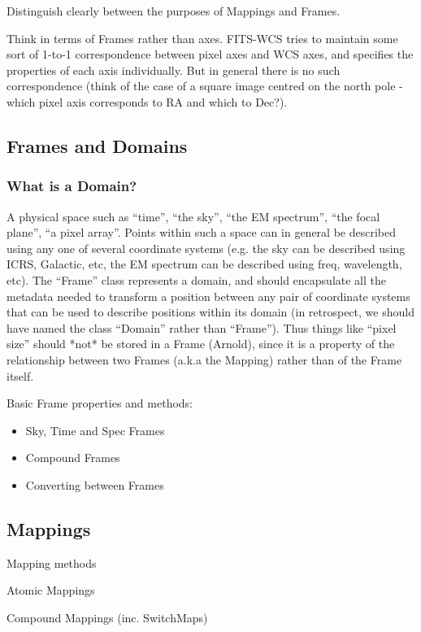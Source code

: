 \documentclass[final,authoryear,5p,times,twocolumn]{elsarticle}
\begin{document}
Distinguish clearly between the purposes of Mappings and Frames.

Think in terms of Frames rather than axes. FITS-WCS tries to maintain
some sort of 1-to-1 correspondence between pixel axes and WCS axes,
and specifies the properties of each axis individually. But in general
there is no such correspondence (think of the case of a square image
centred on the north pole - which pixel axis corresponds to RA and
which to Dec?).

\subsection{Frames and Domains}

\subsubsection{What is a Domain?}

A physical space such as “time”, “the sky”, “the EM spectrum”, “the
focal plane”, “a pixel array”. Points within such a space can in
general be described using any one of several coordinate systems
(e.g. the sky can be described using ICRS, Galactic, etc, the EM
spectrum can be described using freq, wavelength, etc). The “Frame”
class represents a domain, and should encapsulate all the metadata
needed to transform a position between any pair of coordinate systems
that can be used to describe positions within its domain (in
retrospect, we should have named the class “Domain” rather than
“Frame”). Thus things like “pixel size” should *not* be stored in a
Frame (Arnold), since it is a property of the relationship between two
Frames (a.k.a the Mapping) rather than of the Frame itself.

Basic Frame properties and methods:

\begin{itemize}
\item Sky, Time and Spec Frames
\item Compound Frames
\item Converting between Frames
\end{itemize}

\subsection{Mappings}

Mapping methods

Atomic Mappings

Compound Mappings (inc. SwitchMaps)
\end{document}
